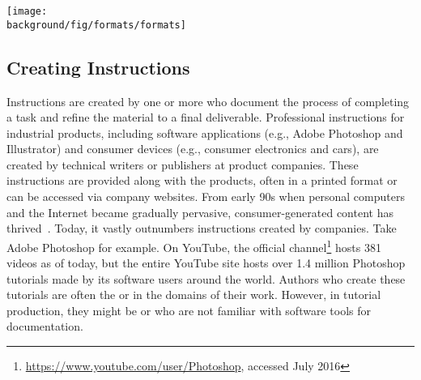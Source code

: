 \begin{figure*}[th!]
  \centering
  \begin{minipage}{\textwidth}
  \texttt{[image: \\background/fig/formats/formats]}
  \caption[Major tutorial forms from online resources.]{
    Major tutorial forms from online resources \footnote{Combine photos on the go, \url{https://helpx.adobe.com/mobile-apps/how-to/combine-photos-photoshop-mix.html}} \footnote{Change the color of an object, \url{https://helpx.adobe.com/photoshop/how-to/change-color-object-photoshop.html}}:
    a) Step-by-step static tutorials show a list of steps, each with text and figure(s) that describe a subtask, such as  or , and
    b) video tutorials show an author performing the task, which can be reviewed and controlled via a video player.
    \\
    \copyright2016 with express permission from Adobe Systems Incorporated.
  }
  \label{fig:background_formats}
  \end{minipage}
\end{figure*}


\subsection{Creating Instructions}
Instructions are created by one or more  who document the process of completing a task and refine the material to a final deliverable.
%
Professional instructions for industrial products, including software applications (e.g., Adobe Photoshop and Illustrator) and consumer devices (e.g., consumer electronics and cars), are created by technical writers or publishers at product companies. These instructions are provided along with the products, often in a printed format or can be accessed via company websites.
%
From early 90s when personal computers and the Internet became gradually pervasive, consumer-generated content has thrived~\cite{Gantt:1992:GGP:142750.142767}. Today, it vastly outnumbers instructions created by companies. Take Adobe Photoshop for example. On YouTube, the official channel\footnote{\url{https://www.youtube.com/user/Photoshop}, accessed July 2016} hosts 381 videos as of today, but the entire YouTube site hosts over 1.4 million Photoshop tutorials made by its software users around the world.
%
Authors who create these tutorials are often the  or  in the domains of their work. However, in tutorial production, they might be  or  who are not familiar with software tools for documentation.

